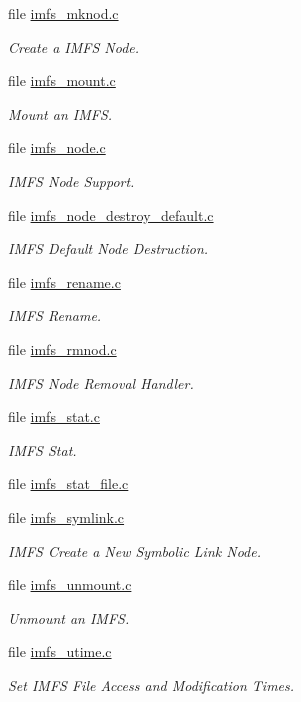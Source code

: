 \begin{DoxyCompactItemize}
file \mbox{\hyperlink{imfs__mknod_8c}{imfs\+\_\+mknod.\+c}}
\begin{DoxyCompactList}\small\item\em Create a I\+M\+FS Node. \end{DoxyCompactList}\item 
file \mbox{\hyperlink{imfs__mount_8c}{imfs\+\_\+mount.\+c}}
\begin{DoxyCompactList}\small\item\em Mount an I\+M\+FS. \end{DoxyCompactList}\item 
file \mbox{\hyperlink{imfs__node_8c}{imfs\+\_\+node.\+c}}
\begin{DoxyCompactList}\small\item\em I\+M\+FS Node Support. \end{DoxyCompactList}\item 
file \mbox{\hyperlink{imfs__node__destroy__default_8c}{imfs\+\_\+node\+\_\+destroy\+\_\+default.\+c}}
\begin{DoxyCompactList}\small\item\em I\+M\+FS Default Node Destruction. \end{DoxyCompactList}\item 
file \mbox{\hyperlink{imfs__rename_8c}{imfs\+\_\+rename.\+c}}
\begin{DoxyCompactList}\small\item\em I\+M\+FS Rename. \end{DoxyCompactList}\item 
file \mbox{\hyperlink{imfs__rmnod_8c}{imfs\+\_\+rmnod.\+c}}
\begin{DoxyCompactList}\small\item\em I\+M\+FS Node Removal Handler. \end{DoxyCompactList}\item 
file \mbox{\hyperlink{imfs__stat_8c}{imfs\+\_\+stat.\+c}}
\begin{DoxyCompactList}\small\item\em I\+M\+FS Stat. \end{DoxyCompactList}\item 
file \mbox{\hyperlink{imfs__stat__file_8c}{imfs\+\_\+stat\+\_\+file.\+c}}
\item 
file \mbox{\hyperlink{imfs__symlink_8c}{imfs\+\_\+symlink.\+c}}
\begin{DoxyCompactList}\small\item\em I\+M\+FS Create a New Symbolic Link Node. \end{DoxyCompactList}\item 
file \mbox{\hyperlink{imfs__unmount_8c}{imfs\+\_\+unmount.\+c}}
\begin{DoxyCompactList}\small\item\em Unmount an I\+M\+FS. \end{DoxyCompactList}\item 
file \mbox{\hyperlink{imfs__utime_8c}{imfs\+\_\+utime.\+c}}
\begin{DoxyCompactList}\small\item\em Set I\+M\+FS File Access and Modification Times. \end{DoxyCompactList}\end{DoxyCompactItemize}
